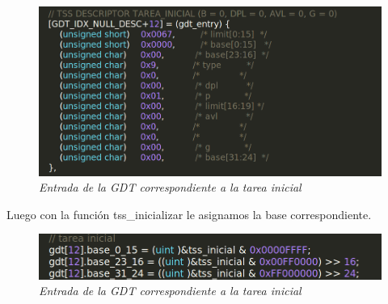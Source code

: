 \begin{figure}[H]
\begin{center}
\includegraphics[width=\linewidth]{ejercicio6/gdt_tarea_inicial.png}
\caption{{\small \textit{Entrada de la GDT correspondiente a la tarea inicial }}}
\endminipage
\end{center}
\end{figure}


Luego con la función tss\_inicializar le asignamos la base correspondiente.

\begin{figure}[H]
\begin{center}
\includegraphics[width=\linewidth]{ejercicio6/tss_inicializar_base_inicial.png}
\caption{{\small \textit{Entrada de la GDT correspondiente a la tarea inicial }}}
\endminipage
\end{center}
\end{figure}


